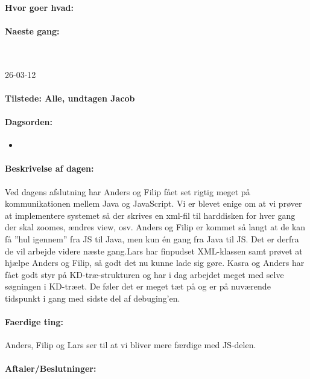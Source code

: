 \documentclass[a4paper,10pt,titlepage]{article}
\begin{document}
		\paragraph{Hvor goer hvad:}
		
		\paragraph{Naeste gang:}\mbox{}\\
		
		\begin{center}
		26-03-12
		\end{center}
		
		\paragraph{Tilstede: Alle, undtagen Jacob}
		\paragraph{Dagsorden:}
		\begin{itemize}
					\item 
					
		\end{itemize}
		
		\paragraph{Beskrivelse af dagen:}
		Ved dagens afslutning har Anders og Filip fået set rigtig meget på kommunikationen mellem Java og JavaScript. Vi er blevet enige om at vi prøver at implementere systemet så der skrives en xml-fil til harddisken for hver gang der skal zoomes, ændres view, osv. Anders og Filip er kommet så langt at de kan få ”hul igennem” fra JS til Java, men kun én gang fra Java til JS. Det er derfra de vil arbejde videre næste gang.Lars har finpudset XML-klassen samt prøvet at hjælpe Anders og Filip, så godt det nu kunne lade sig gøre.
Kasra og Anders har fået godt styr på KD-træ-strukturen og har i dag arbejdet meget med selve søgningen i KD-træet. De føler det er meget tæt på og er på nuværende tidspunkt i gang med sidste del af debuging’en.

		\paragraph{Faerdige ting:}
		Anders, Filip og Lars ser til at vi bliver mere færdige med JS-delen.
		\paragraph{Aftaler/Beslutninger:}
		
\end{document}
